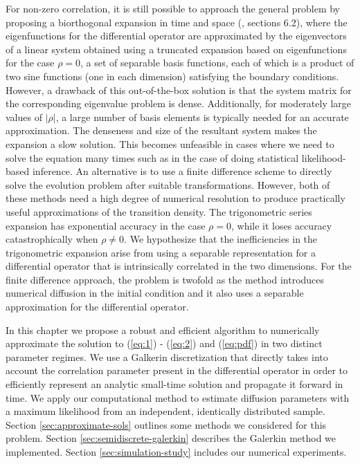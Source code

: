 For non-zero correlation, it is still possible to approach the general
problem by proposing a biorthogonal expansion in time and space
(\cite{risken1989fokker-planck}, sections 6.2), where the
eigenfunctions for the differential operator are approximated by the
eigenvectors of a linear system obtained using a truncated expansion
based on eigenfunctions for the case $\rho=0$, a set of separable
basis functions, each of which is a product of two sine functions (one
in each dimension) satisfying the boundary conditions. However, a
drawback of this out-of-the-box solution is that the system matrix for
the corresponding eigenvalue problem is dense. Additionally, for
moderately large values of $|\rho|$, a large number of basis elements
is typically needed for an accurate approximation. The denseness and
size of the resultant system makes the expansion a slow solution. This
becomes unfeasible in cases where we need to solve the equation many
times such as in the case of doing statistical likelihood-based
inference. An alternative is to use a finite difference scheme to
directly solve the evolution problem after suitable
transformations. However, both of these methods need a high degree of
numerical resolution to produce practically useful approximations of
the transition density. The trigonometric series expansion has
exponential accuracy in the case $\rho=0$, while it loses accuracy
catastrophically when $\rho\neq 0$. We hypothesize that the
inefficiencies in the trigonometric expansion arise from using a
separable representation for a differential operator that is
intrinsically correlated in the two dimensions. For the finite
difference approach, the problem is twofold as the method introduces
numerical diffusion in the initial condition and it also uses a
separable approximation for the differential operator.

In this chapter we propose a robust and efficient algorithm to
numerically approximate the solution to (\ref{eq:1}) - (\ref{eq:2})
and (\ref{eq:pdf}) in two distinct parameter regimes. We use a
Galkerin discretization that directly takes into account the
correlation parameter present in the differential operator in order to
efficiently represent an analytic small-time solution and propagate it
forward in time. We apply our computational method to estimate
diffusion parameters with a maximum likelihood from an independent,
identically distributed sample. Section \ref{sec:approximate-sols}
outlines some methods we considered for this problem. Section
\ref{sec:semidiscrete-galerkin} describes the Galerkin method we
implemented. Section \ref{sec:simulation-study} includes our numerical
experiments.


